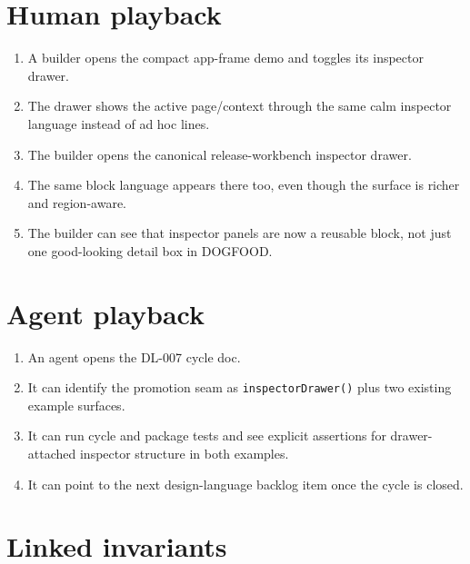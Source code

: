 \section{Human playback}\label{record-174-human-playback}

\begin{enumerate}
\def\labelenumi{\arabic{enumi}.}
\tightlist
\item
  A builder opens the compact app-frame demo and toggles its inspector drawer.
\item
  The drawer shows the active page/context through the same calm inspector language instead of ad hoc lines.
\item
  The builder opens the canonical release-workbench inspector drawer.
\item
  The same block language appears there too, even though the surface is richer and region-aware.
\item
  The builder can see that inspector panels are now a reusable block, not just one good-looking detail box in DOGFOOD.
\end{enumerate}

\section{Agent playback}\label{record-174-agent-playback}

\begin{enumerate}
\def\labelenumi{\arabic{enumi}.}
\tightlist
\item
  An agent opens the DL-007 cycle doc.
\item
  It can identify the promotion seam as \texttt{i\allowbreak{}n\allowbreak{}s\allowbreak{}p\allowbreak{}e\allowbreak{}c\allowbreak{}t\allowbreak{}o\allowbreak{}r\allowbreak{}D\allowbreak{}r\allowbreak{}a\allowbreak{}w\allowbreak{}e\allowbreak{}r\allowbreak{}(\allowbreak{})} plus two existing example surfaces.
\item
  It can run cycle and package tests and see explicit assertions for drawer-attached inspector structure in both examples.
\item
  It can point to the next design-language backlog item once the cycle is closed.
\end{enumerate}

\section{Linked invariants}\label{record-174-linked-invariants}


